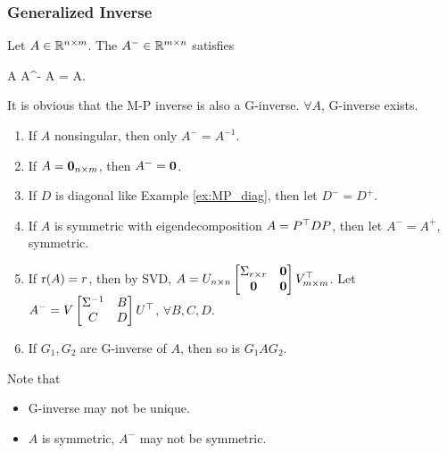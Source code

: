 \documentclass[10pt,a4paper]{book}
\begin{document}
\subsubsection{Generalized Inverse}\label{sec:gen_inv}
\begin{defbox}
	\begin{definition}\label{def:gen_inv}
		Let $A\in\mathbb R^{n\times m}$. The  $A^-\in\mathbb R^{m\times n}$ satisfies 
		\begin{sequation*}
			A A^- A = A.
		\end{sequation*}
	\end{definition}
\end{defbox}
It is obvious that the M-P inverse is also a G-inverse. 
$\forall A$, G-inverse exists.
\begin{enumerate}
	\item If $A$ nonsingular, then only $A^-=A^{-1}$.
	\item If $A={\boldsymbol 0}_{n\times m}$, then $A^{-}={\boldsymbol 0}$.
	\item If $D$ is diagonal like Example \ref{ex:MP_diag}, then let $D^{-}=D^{+}$.
	\item If $A$ is symmetric with eigendecomposition $A=P^\top D P$, then let $A^-=A^+$, symmetric.    
	\item If $\mathrm{r}(A)=r$, then by SVD, $A=U_{n\times n}\begin{bmatrix}
		\Sigma_{r\times r} & {\boldsymbol 0} \\ {\boldsymbol 0} & {\boldsymbol 0}
	\end{bmatrix}V_{m\times m}^\top$. Let $A^{-}=V\begin{bmatrix}
		\Sigma^{-1} & B \\ C & D
	\end{bmatrix}U^\top$, $\forall B,C,D$. 
	\item If $G_1,G_2$ are G-inverse of $A$, then so is $G_1AG_2$.   
\end{enumerate}  
Note that 
\begin{itemize}
	\item G-inverse may not be unique. 
	\item $A$ is symmetric, $A^-$ may not be symmetric.   
\end{itemize}
\end{document}
